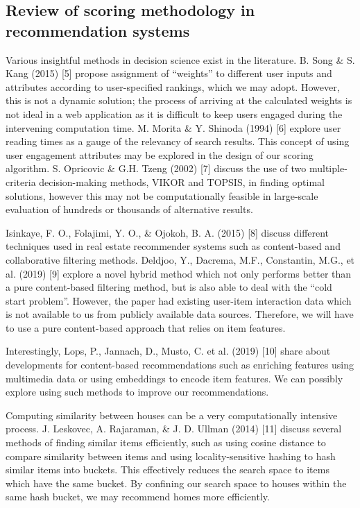 \documentclass[a4paper, 11pt]{article}
\begin{document}
    \subsection{Review of scoring methodology in recommendation systems} 
    Various insightful methods in decision science exist in the literature. B. Song \& S. Kang (2015) [5] propose assignment of “weights” to different user inputs and attributes according to user-specified rankings, which we may adopt. However, this is not a dynamic solution; the process of arriving at the calculated weights is not ideal in a web application as it is difficult to keep users engaged during the intervening computation time. M. Morita \& Y. Shinoda (1994) [6] explore user reading times as a gauge of the relevancy of search results. This concept of using user engagement attributes may be explored in the design of our scoring algorithm. S. Opricovic \& G.H. Tzeng (2002) [7] discuss the use of two multiple-criteria decision-making methods, VIKOR and TOPSIS, in finding optimal solutions, however this may not be computationally feasible in large-scale evaluation of hundreds or thousands of alternative results. 
    
    Isinkaye, F. O., Folajimi, Y. O., \& Ojokoh, B. A. (2015) [8] discuss different techniques used in real estate recommender systems such as content-based and collaborative filtering methods. Deldjoo, Y., Dacrema, M.F., Constantin, M.G., et al. (2019) [9] explore a novel hybrid method which not only performs better than a pure content-based filtering method, but is also able to deal with the “cold start problem”. However, the paper had existing user-item interaction data which is not available to us from publicly available data sources. Therefore, we will have to use a pure content-based approach that relies on item features. 
    
    Interestingly, Lops, P., Jannach, D., Musto, C. et al. (2019) [10] share about developments for content-based recommendations such as enriching features using multimedia data or using embeddings to encode item features. We can possibly explore using such methods to improve our recommendations. 
    
    Computing similarity between houses can be a very computationally intensive process. J. Leskovec, A. Rajaraman, \& J. D. Ullman (2014) [11] discuss several methods of finding similar items efficiently, such as using cosine distance to compare similarity between items and using locality-sensitive hashing to hash similar items into buckets. This effectively reduces the search space to items which have the same bucket. By confining our search space to houses within the same hash bucket, we may recommend homes more efficiently. 
\end{document}
